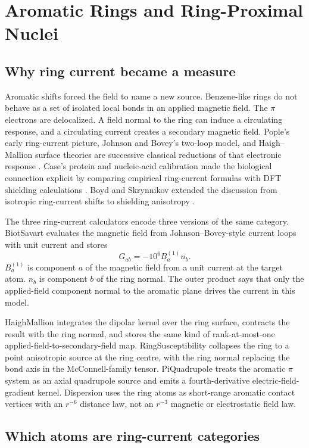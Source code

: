\documentclass[11pt]{article}
\begin{document}
\section{Aromatic Rings and Ring-Proximal Nuclei}

\subsection{Why ring current became a measure}

Aromatic shifts forced the field to name a new source. Benzene-like rings do
not behave as a set of isolated local bonds in an applied magnetic field. The
\(\pi\) electrons are delocalized. A field normal to the ring can induce a
circulating response, and a circulating current creates a secondary magnetic
field. Pople's early ring-current picture, Johnson and Bovey's two-loop model,
and Haigh--Mallion surface theories are successive classical reductions of that
electronic response \cite{pople1956,johnson1958,haigh1979}. Case's protein and
nucleic-acid calibration made the biological connection explicit by comparing
empirical ring-current formulas with DFT shielding calculations
\cite{case1995}. Boyd and Skrynnikov extended the discussion from isotropic
ring-current shifts to shielding anisotropy \cite{boyd2002}.

The three ring-current calculators encode three versions of the same category.
BiotSavart evaluates the magnetic field from Johnson--Bovey-style current loops
with unit current and stores
\[
  G_{ab}=-10^6 B^{(1)}_a n_b .
\]
\(B^{(1)}_a\) is component \(a\) of the magnetic field from a unit current at
the target atom. \(n_b\) is component \(b\) of the ring normal. The outer
product says that only the applied-field component normal to the aromatic plane
drives the current in this model.

HaighMallion integrates the dipolar kernel over the ring surface, contracts the
result with the ring normal, and stores the same kind of rank-at-most-one
applied-field-to-secondary-field map. RingSusceptibility collapses the ring to
a point anisotropic source at the ring centre, with the ring normal replacing
the bond axis in the McConnell-family tensor. PiQuadrupole treats the aromatic
\(\pi\) system as an axial quadrupole source and emits a fourth-derivative
electric-field-gradient kernel. Dispersion uses the ring atoms as short-range
aromatic contact vertices with an \(r^{-6}\) distance law, not an \(r^{-3}\)
magnetic or electrostatic field law.

\subsection{Which atoms are ring-current categories}
\end{document}
